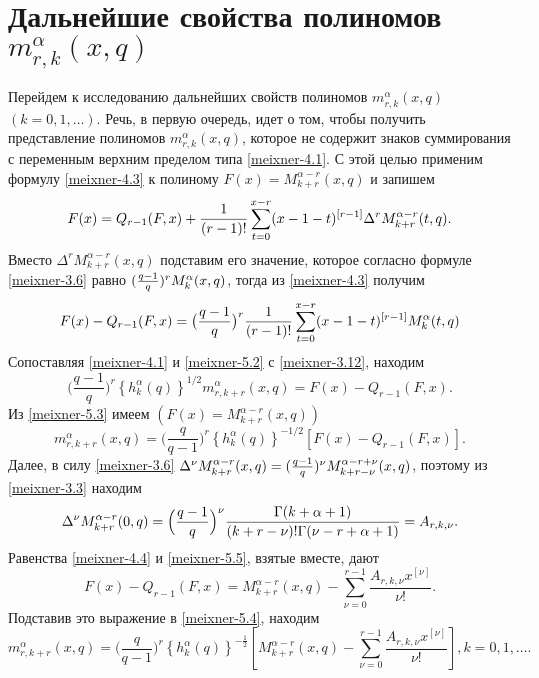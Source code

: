\section{Дальнейшие свойства полиномов $m_{r,k}^{\alpha}(x,q)$}

Перейдем к исследованию дальнейших свойств полиномов $m_{r,k}^{\alpha}(x,q)$ $(k=0, 1,\ldots)$. Речь, в первую очередь,  идет о том, чтобы получить представление полиномов   $m_{r,k}^{\alpha}(x,q)$, которое не содержит знаков суммирования с переменным верхним пределом типа \eqref{meixner-4.1}. С этой целью  применим  формулу \eqref{meixner-4.3}    к полиному $F(x)=M_{k+r}^{\alpha-r}(x,q)$ и запишем
 \begin{equation}\label{meixner-5.1}
 F(x)=Q_{r-1}(F,x)+ {1\over(r-1)!}\sum_{t=0}^{x-r} (x-1-t)^{[r-1]}\Delta^rM_{k+r}^{\alpha-r}(t,q).
\end{equation}
Вместо $\Delta^rM_{k+r}^{\alpha-r}(x,q)$ подставим его значение, которое согласно формуле \eqref{meixner-3.6} равно \linebreak$({q-1\over q})^rM_k^{\alpha}(x,q)$, тогда из \eqref{meixner-4.3} получим
 \begin{equation}\label{meixner-5.2}
F(x)-Q_{r-1}(F,x)=\big(\frac{q-1}{q}\big)^r{1\over(r-1)!}\sum_{t=0}^{x-r} (x-1-t)^{[r-1]}M_k^{\alpha}(t,q)
\end{equation}
Сопоставляя \eqref{meixner-4.1} и \eqref{meixner-5.2} с \eqref{meixner-3.12}, находим
\begin{equation}\label{meixner-5.3}
\big(\frac{q-1}{q}\big)^r\left\{h_{k}^{\alpha}(q)\right\}^{1/2}m_{r,k+r}^{\alpha}(x,q)=
F(x)-Q_{r-1}(F,x).
\end{equation}
Из \eqref{meixner-5.3} имеем $\left(F(x)=M_{k+r}^{\alpha-r}(x,q)\right)$
\begin{equation}\label{meixner-5.4}
m_{r,k+r}^{\alpha}(x,q)= \big(\frac{q}{q-1}\big)^r\left\{h_{k}^{\alpha}(q)\right\}^{-1/2}
[F(x)-Q_{r-1}(F,x)].
\end{equation}
Далее, в силу \eqref{meixner-3.6}
$\Delta^\nu M_{k+r}^{\alpha-r}(x,q)=({q-1\over q})^\nu M_{k+r-\nu}^{\alpha-r+\nu}(x,q)$,
поэтому из \eqref{meixner-3.3} находим
\begin{equation}\label{meixner-5.5}
\Delta^\nu M_{k+r}^{\alpha-r}(0,q)= \Big({q-1\over q}\Big)^\nu \frac{\Gamma(k+\alpha+1)}{(k+r-\nu)!\Gamma(\nu-r+\alpha+1)}=A_{r,k,\nu}.
\end{equation}
 Равенства \eqref{meixner-4.4}  и  \eqref{meixner-5.5}, взятые вместе, дают
\begin{equation}\label{meixner-5.6}
F(x)-Q_{r-1}(F,x)=M_{k+r}^{\alpha-r}(x,q)-\sum_{\nu=0}^{r-1}\frac{A_{r,k,\nu}x^{[\nu]}}{\nu!}.
 \end{equation}
 Подставив это выражение в \eqref{meixner-5.4},  находим
\begin{equation}\label{meixner-5.7}
m_{r,k+r}^{\alpha}(x,q)=\big(\frac{q}{q-1}\big)^r\left\{h_{k}^{\alpha}(q)\right\}^{-\frac12}
\left[M_{k+r}^{\alpha-r}(x,q)-\sum_{\nu=0}^{r-1}\frac{A_{r,k,\nu}x^{[\nu]}}{\nu!}\right], k=0,1,\ldots.
\end{equation}

